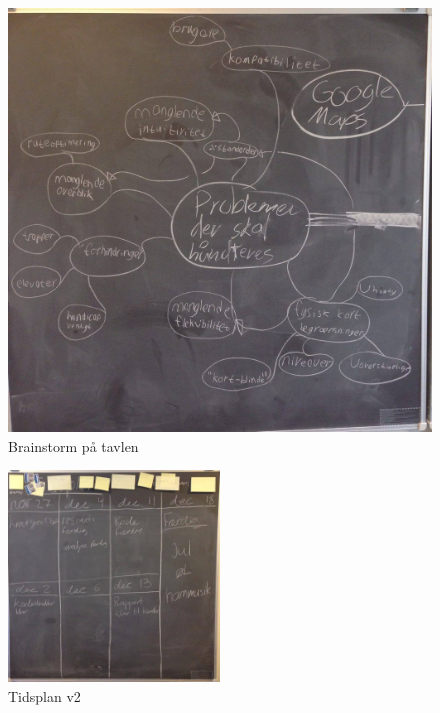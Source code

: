 \documentclass[a4paper,12pt,oneside,article]{memoir}
\begin{document}
        \begin{figure}
        \centering
                \includegraphics[width=\textwidth]{Images/7.jpg}
                \caption{Brainstorm på tavlen}
                \label{fig:struktur3}
        \end{figure}

            \begin{figure}[ht!]
                \centering
                \includegraphics[width=0.5\textwidth]{Images/2.jpg}
                \caption{Tidsplan v2}
                \label{fig:tidsplan_v2}
            \end{figure}


\end{document}
